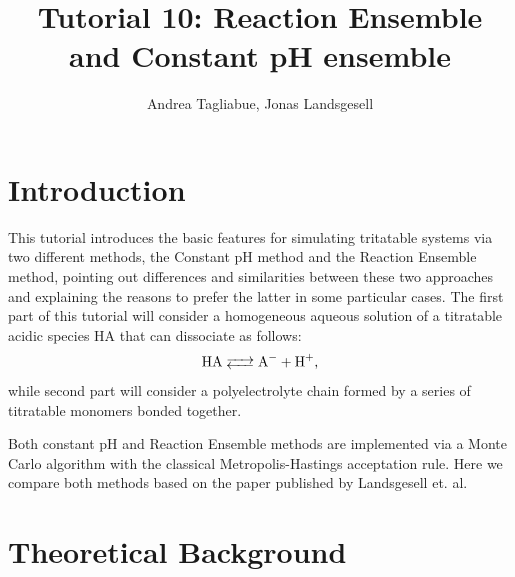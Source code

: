 \documentclass[
a4paper,                        %
11pt,                           %
twoside,                        %
footsepline,                    %
headsepline,                    %
headexclude,                    %
footexclude,                    %
pagesize,                       %
]{scrartcl}
\begin{document}
\title{Tutorial 10: Reaction Ensemble and Constant pH ensemble}
\author{Andrea Tagliabue, Jonas Landsgesell}

\maketitle
\tableofcontents

\section{Introduction}

This tutorial introduces the basic features for simulating tritatable systems via two different methods, the Constant pH method and the Reaction Ensemble method, pointing out differences and similarities between these two approaches and explaining the reasons to prefer the latter in some particular cases.
The first part of this tutorial will consider a homogeneous aqueous solution of a titratable acidic species HA that can dissociate as follows:
\begin{equation}\label{disso}
\ce{HA <--> A- + H+}\text{,}
\end{equation}
while second part will consider a polyelectrolyte chain formed by a series of titratable monomers bonded together.

\noindent Both constant pH and Reaction Ensemble methods are implemented via a Monte Carlo algorithm with the classical Metropolis-Hastings acceptation rule. Here we compare both methods based on the paper published by Landsgesell et. al\cite{landsgesell2017simulation}.

\section{Theoretical Background}
\end{document}

